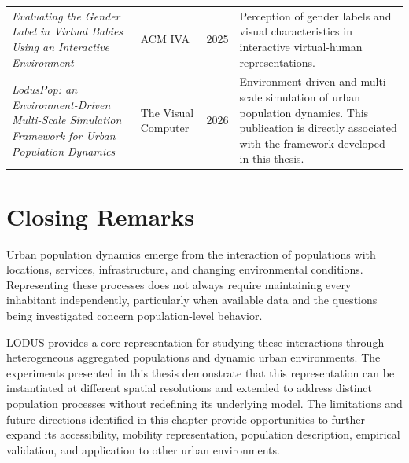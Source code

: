 \begin{table}[ht]
\begin{tabularx}{\linewidth}{@{}p{4.9cm}p{2.6cm}p{0.8cm}X@{}}
        \textit{Evaluating the Gender Label in Virtual Babies Using an Interactive Environment}~\cite{araujo2025gender}
        & ACM IVA
        & 2025
        & Perception of gender labels and visual characteristics in interactive virtual-human representations. \\

        \textit{LodusPop: an Environment-Driven Multi-Scale Simulation Framework for Urban Population Dynamics}~\cite{silva2026lodusPop}
        & The Visual Computer
        & 2026
        & Environment-driven and multi-scale simulation of urban population dynamics. This publication is directly associated with the framework developed in this thesis. \\

        \bottomrule
    \end{tabularx}
\end{table}


\section{Closing Remarks}
\label{sec:final_closing}

Urban population dynamics emerge from the interaction of populations with locations, services, infrastructure, and changing environmental conditions. Representing these processes does not always require maintaining every inhabitant independently, particularly when available data and the questions being investigated concern population-level behavior.

LODUS provides a core representation for studying these interactions through heterogeneous aggregated populations and dynamic urban environments. The experiments presented in this thesis demonstrate that this representation can be instantiated at different spatial resolutions and extended to address distinct population processes without redefining its underlying model. The limitations and future directions identified in this chapter provide opportunities to further expand its accessibility, mobility representation, population description, empirical validation, and application to other urban environments.
